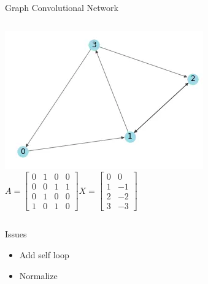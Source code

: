 \begin{frame}[t]{Graph Convolutional Network}
    \begin{columns}[onlytextwidth]
        
        \includegraphics[scale=.38]{images/GCNExampleNet.png}
                                               \begin{math}
                                                    A =
                                                        \begin{bmatrix}
                                                            0 & 1 & 0 & 0\\
                                                            0 & 0 & 1 & 1\\
                                                            0 & 1 & 0 & 0\\
                                                            1 & 0 & 1 & 0
                                                        \end{bmatrix}
                                                    X = \begin{bmatrix}
                                                            0 &  0\\
                                                            1 & -1\\
                                                            2 & -2\\
                                                            3 & -3
                                                        \end{bmatrix}
                                                \end{math}
    \end{columns}

    \begin{block}{Issues}
        \begin{itemize}
            \item Add self loop
            \item Normalize
        \end{itemize}
    \end{block}


\end{frame}
